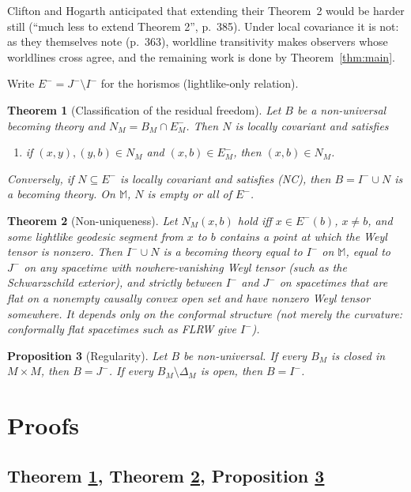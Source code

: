 \documentclass[11pt]{article}
\newtheorem{theorem}{Theorem}
\newtheorem{proposition}[theorem]{Proposition}
\theoremstyle{definition}
\newcommand{\Mink}{\mathbb M}
\newcommand{\Ichr}{I^{-}}
\newcommand{\Jm}{J^{-}}
\begin{document}
Clifton and Hogarth anticipated that extending their Theorem~2 would be
harder still (``much less to extend Theorem 2'', p.~385). Under local
covariance it is not: as they themselves note (p.~363), worldline transitivity
makes observers whose worldlines cross agree, and the remaining work is done by
Theorem~\ref{thm:main}.

Write $E^-=\Jm\setminus\Ichr$ for the horismos (lightlike-only relation).

\begin{theorem}[Classification of the residual freedom]\label{thm:class}
Let $B$ be a non-universal becoming theory and $N_M=B_M\cap E^-_M$. Then $N$
is locally covariant and satisfies
\begin{enumerate}
\item[(NC)] if $(x,y),(y,b)\in N_M$ and $(x,b)\in E^-_M$, then $(x,b)\in N_M$.
\end{enumerate}
Conversely, if $N\subseteq E^-$ is locally covariant and satisfies (NC), then
$B=\Ichr\cup N$ is a becoming theory. On $\Mink$, $N$ is empty or all of $E^-$.
\end{theorem}

\begin{theorem}[Non-uniqueness]\label{thm:weyl}
Let $N_M(x,b)$ hold iff $x\in E^-(b)$, $x\neq b$, and some lightlike geodesic
segment from $x$ to $b$ contains a point at which the Weyl tensor is nonzero.
Then $\Ichr\cup N$ is a becoming theory equal to $\Ichr$ on $\Mink$, equal to
$\Jm$ on any spacetime with nowhere-vanishing Weyl tensor (such as the
Schwarzschild exterior), and strictly between $\Ichr$ and $\Jm$ on spacetimes
that are flat on a nonempty causally convex open set and have nonzero Weyl
tensor somewhere. It depends only on the conformal structure (not merely the
curvature: conformally flat spacetimes such as FLRW give $\Ichr$).
\end{theorem}

\begin{proposition}[Regularity]\label{prop:reg}
Let $B$ be non-universal. If every $B_M$ is closed in $M\times M$, then
$B=\Jm$. If every $B_M\setminus\Delta_M$ is open, then $B=\Ichr$.
\end{proposition}

\section{Proofs}\label{sec:proofs}

\subsection{Theorem \ref{thm:class}, Theorem \ref{thm:weyl}, Proposition \ref{prop:reg}}
\end{document}
